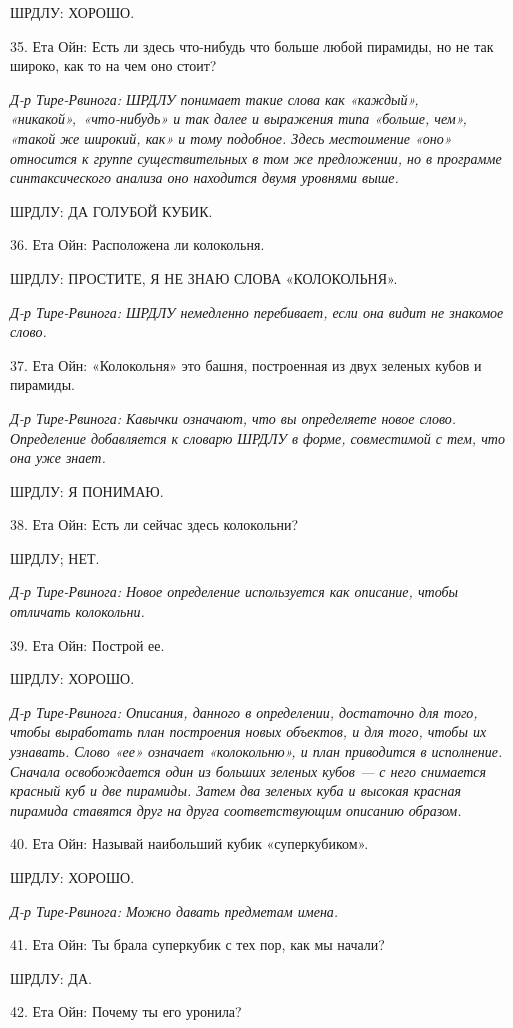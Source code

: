 ШРДЛУ: ХОРОШО.

35. Ета Ойн: Есть ли здесь что-нибудь что больше любой пирамиды, но не так широко, как то на чем оно стоит?

\emph{Д-р Тире-Рвинога: ШРДЛУ понимает такие слова как «каждый», «никакой»,~«что-нибудь» и так далее и выражения типа «больше, чем», «такой же широкий, как» и тому подобное. Здесь местоимение «оно» относится к группе существительных в том же предложении, но в программе синтаксического анализа оно находится двумя уровнями выше.}

ШРДЛУ: ДА ГОЛУБОЙ КУБИК.

36. Ета Ойн: Расположена ли колокольня.

ШРДЛУ: ПРОСТИТЕ, Я НЕ ЗНАЮ СЛОВА «КОЛОКОЛЬНЯ».

\emph{Д-р Тире-Рвинога: ШРДЛУ немедленно перебивает, если она видит не знакомое слово.}

37. Ета Ойн: «Колокольня» это башня, построенная из двух зеленых кубов и пирамиды.

\emph{Д-р Тире-Рвинога: Кавычки означают, что вы определяете новое слово. Определение добавляется к словарю ШРДЛУ в форме, совместимой с тем, что она уже знает.}

ШРДЛУ: Я ПОНИМАЮ.

38. Ета Ойн: Есть ли сейчас здесь колокольни?

ШРДЛУ; НЕТ.

\emph{Д-р Тире-Рвинога: Новое определение используется как описание, чтобы отличать колокольни.}

39. Ета Ойн: Построй ее.

ШРДЛУ: ХОРОШО.

\emph{Д-р Тире-Рвинога: Описания, данного в определении, достаточно для того, чтобы выработать план построения новых объектов, и для того, чтобы их узнавать. Слово «ее» означает «колокольню», и план приводится в исполнение. Сначала освобождается один из больших зеленых кубов --- с него снимается красный куб и две пирамиды. Затем два зеленых куба и высокая красная пирамида ставятся друг на друга соответствующим описанию образом.}

40. Ета Ойн: Называй наибольший кубик «суперкубиком».

ШРДЛУ: ХОРОШО.

\emph{Д-р Тире-Рвинога: Можно давать предметам имена.}

41. Ета Ойн: Ты брала суперкубик с тех пор, как мы начали?

ШРДЛУ: ДА.

42. Ета Ойн: Почему ты его уронила?

